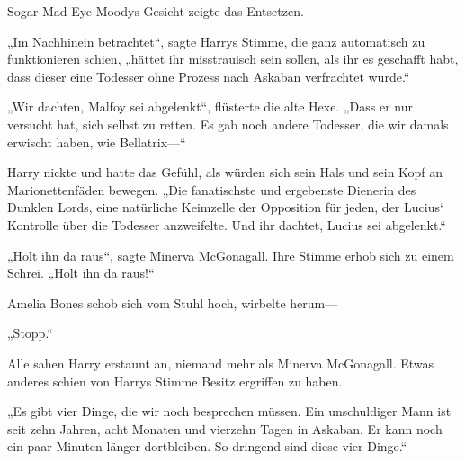 Sogar Mad-Eye Moodys Gesicht zeigte das Entsetzen.

„Im Nachhinein betrachtet“, sagte Harrys Stimme, die ganz automatisch zu funktionieren schien, „hättet ihr misstrauisch sein sollen, als ihr es geschafft habt, dass dieser eine Todesser ohne Prozess nach Askaban verfrachtet wurde.“

„Wir dachten, Malfoy sei abgelenkt“, flüsterte die alte Hexe. „Dass er nur versucht hat, sich selbst zu retten. Es gab noch andere Todesser, die wir damals erwischt haben, wie Bellatrix—“

Harry nickte und hatte das Gefühl, als würden sich sein Hals und sein Kopf an Marionettenfäden bewegen.
„Die fanatischste und ergebenste Dienerin des Dunklen Lords, eine natürliche Keimzelle der Opposition für jeden, der Lucius‘ Kontrolle über die Todesser anzweifelte. Und ihr dachtet, Lucius sei abgelenkt.“

„Holt ihn da raus“, sagte Minerva McGonagall. Ihre Stimme erhob sich zu einem Schrei. „Holt ihn da raus!“

Amelia Bones schob sich vom Stuhl hoch, wirbelte herum—

„Stopp.“

Alle sahen Harry erstaunt an, niemand mehr als Minerva McGonagall. Etwas anderes schien von Harrys Stimme Besitz ergriffen zu haben.

„Es gibt vier Dinge, die wir noch besprechen müssen. Ein unschuldiger Mann ist seit zehn Jahren, acht Monaten und vierzehn Tagen in Askaban. Er kann noch ein paar Minuten länger dortbleiben. So dringend sind diese vier Dinge.“

